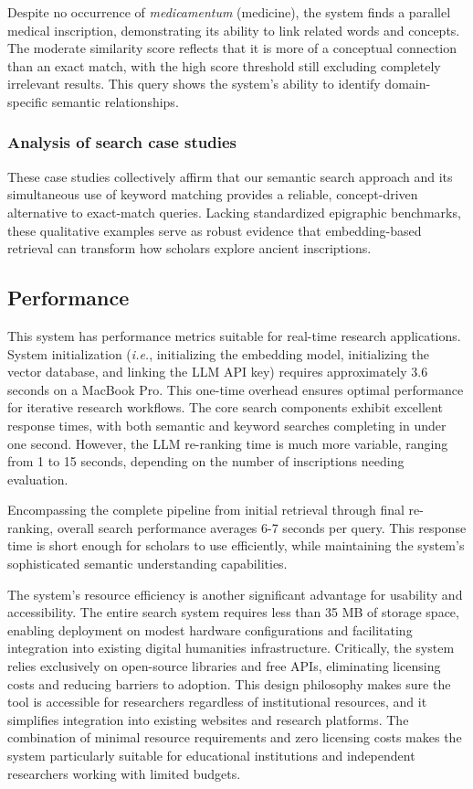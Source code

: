 \documentclass[final,greek,american]{anthology-ch}
\newcommand{\ie}{\textit{i.e.},\xspace}
\begin{document}
Despite no occurrence of \textit{medicamentum} (medicine), the system finds a parallel medical inscription, demonstrating its ability to link related words and concepts. The moderate similarity score reflects that it is more of a conceptual connection than an exact match, with the high score threshold still excluding completely irrelevant results. This query shows the system's ability to identify domain-specific semantic relationships.

\subsubsection{Analysis of search case studies}

These case studies collectively affirm that our semantic search approach and its simultaneous use of keyword matching provides a reliable, concept-driven alternative to exact-match queries. Lacking standardized epigraphic benchmarks, these qualitative examples serve as robust evidence that embedding-based retrieval can transform how scholars explore ancient inscriptions.

\subsection{Performance}

This system has performance metrics suitable for real-time research applications. System initialization (\ie initializing the embedding model, initializing the vector database, and linking the LLM API key) requires approximately 3.6 seconds on a MacBook Pro.
This one-time overhead ensures optimal performance for iterative research workflows. The core search components exhibit excellent response times, with both semantic and keyword searches completing in under one second. However, the LLM re-ranking time is much more variable, ranging from 1 to 15 seconds, depending on the number of inscriptions needing evaluation.

Encompassing the complete pipeline from initial retrieval through final re-ranking, overall search performance averages 6-7 seconds per query. This response time is short enough for scholars to use efficiently, while maintaining the system's sophisticated semantic understanding capabilities.

The system's resource efficiency is another significant advantage for usability and accessibility. The entire search system requires less than 35 MB of storage space, enabling deployment on modest hardware configurations and facilitating integration into existing digital humanities infrastructure. Critically, the system relies exclusively on open-source libraries and free APIs, eliminating licensing costs and reducing barriers to adoption. This design philosophy makes sure the tool is accessible for researchers regardless of institutional resources, and it simplifies integration into existing websites and research platforms. The combination of minimal resource requirements and zero licensing costs makes the system particularly suitable for educational institutions and independent researchers working with limited budgets.
\end{document}
